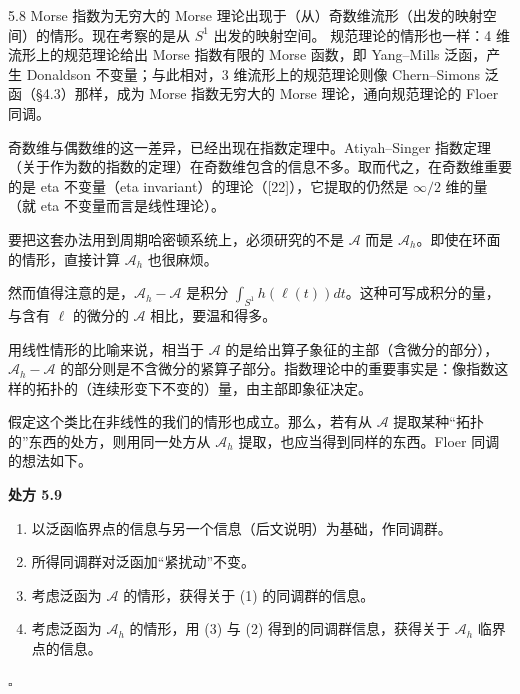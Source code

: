 \begin{remark}{5.8}
  Morse 指数为无穷大的 Morse 理论出现于（从）奇数维流形（出发的映射空间）的情形。现在考察的是从 $S^1$ 出发的映射空间。
  规范理论的情形也一样：4 维流形上的规范理论给出 Morse 指数有限的 Morse 函数，即 Yang–Mills 泛函，产生 Donaldson 不变量；与此相对，3 维流形上的规范理论则像 Chern–Simons 泛函（§4.3）那样，成为 Morse 指数无穷大的 Morse 理论，通向规范理论的 Floer 同调。
\end{remark}


奇数维与偶数维的这一差异，已经出现在指数定理中。Atiyah–Singer 指数定理（关于作为数的指数的定理）在奇数维包含的信息不多。取而代之，在奇数维重要的是 eta 不变量（eta invariant）的理论（[22]），它提取的仍然是 $\infty/2$ 维的量（就 eta 不变量而言是线性理论）。

要把这套办法用到周期哈密顿系统上，必须研究的不是 $\mathcal{A}$ 而是 $\mathcal{A}_h$。即使在环面的情形，直接计算 $\mathcal{A}_h$ 也很麻烦。

然而值得注意的是，$\mathcal{A}_h-\mathcal{A}$ 是积分 $\int_{S^1}h(\ell(t))dt$。这种可写成积分的量，与含有 $\ell$ 的微分的 $\mathcal{A}$ 相比，要温和得多。

用线性情形的比喻来说，相当于 $\mathcal{A}$ 的是给出算子象征的主部（含微分的部分），$\mathcal{A}_h-\mathcal{A}$ 的部分则是不含微分的紧算子部分。指数理论中的重要事实是：像指数这样的拓扑的（连续形变下不变的）量，由主部即象征决定。

假定这个类比在非线性的我们的情形也成立。那么，若有从 $\mathcal{A}$ 提取某种“拓扑的”东西的处方，则用同一处方从 $\mathcal{A}_h$ 提取，也应当得到同样的东西。Floer 同调的想法如下。

\textbf{处方 5.9}
\begin{enumerate}[label=（\arabic*）,leftmargin=2.8em]
  \item 以泛函临界点的信息与另一个信息（后文说明）为基础，作同调群。
  \item 所得同调群对泛函加“紧扰动”不变。

  \item 考虑泛函为 $\mathcal{A}$ 的情形，获得关于 (1) 的同调群的信息。
  \item 考虑泛函为 $\mathcal{A}_h$ 的情形，用 (3) 与 (2) 得到的同调群信息，获得关于 $\mathcal{A}_h$ 临界点的信息。
\end{enumerate}
\hfill$\square$

